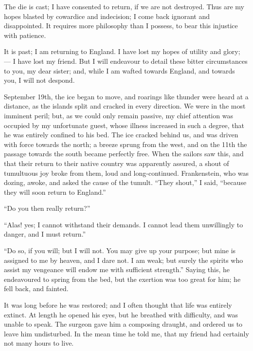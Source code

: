 The die is cast; I have consented to
return, if we are not destroyed. Thus
are my hopes blasted by cowardice and
indecision; I come back ignorant and
disappointed. It requires more philosophy
than I possess, to bear this injustice
with patience.

\medskip
{}

It is past; I am returning to England.
I have lost my hopes of utility
and glory; --- I have lost my friend.
But I will endeavour to detail these
bitter circumstances to you, my dear
sister; and, while I am wafted towards
England, and towards you, I will not
despond.

September 19th, the ice began to
move, and roarings like thunder were
heard at a distance, as the islands
split and cracked in every direction.
We were in the most imminent peril;
but, as we could only remain passive,
my chief attention was occupied by my
unfortunate guest, whose illness increased
in such a degree, that he was
entirely confined to his bed. The ice
cracked behind us, and was driven with
force towards the north; a breeze
sprung from the west, and on the 11th
the passage towards the south became
perfectly free. When the sailors saw
this, and that their return to their
native country was apparently assured,
a shout of tumultuous joy broke from
them, loud and long-continued. Frankenstein,
who was dozing, awoke, and
asked the cause of the tumult. ``They
shout,'' I said, ``because they will soon
return to England.''

``Do you then really return?''

``Alas! yes; I cannot withstand their
demands. I cannot lead them unwillingly
to danger, and I must return.''

``Do so, if you will; but I will not.
You may give up your purpose; but
mine is assigned to me by heaven, and
I dare not. I am weak; but surely the
spirits who assist my vengeance will
endow me with sufficient strength.''
Saying this, he endeavoured to spring
from the bed, but the exertion was
too great for him; he fell back, and
fainted.

It was long before he was restored;
and I often thought that life was entirely
extinct. At length he opened his eyes,
but he breathed with difficulty, and was
unable to speak. The surgeon gave
him a composing draught, and ordered
us to leave him undisturbed. In
the mean time he told me, that my
friend had certainly not many hours to
live.

